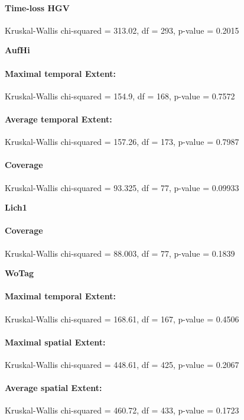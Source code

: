 \paragraph{Time-loss HGV}
Kruskal-Wallis chi-squared = 313.02, df = 293, p-value = 0.2015

\large
\centerline{\textbf{AufHi}}
\normalsize

\paragraph{Maximal temporal Extent:}
Kruskal-Wallis chi-squared = 154.9, df = 168, p-value = 0.7572

\paragraph{Average temporal Extent:}
Kruskal-Wallis chi-squared = 157.26, df = 173, p-value = 0.7987

\paragraph{Coverage}
Kruskal-Wallis chi-squared = 93.325, df = 77, p-value = 0.09933

\large
\centerline{\textbf{Lich1}}
\normalsize

\paragraph{Coverage}
Kruskal-Wallis chi-squared = 88.003, df = 77, p-value = 0.1839

\large
\centerline{\textbf{WoTag}}
\normalsize

\paragraph{Maximal temporal Extent:}
Kruskal-Wallis chi-squared = 168.61, df = 167, p-value = 0.4506

\paragraph{Maximal spatial Extent:}
Kruskal-Wallis chi-squared = 448.61, df = 425, p-value = 0.2067

\paragraph{Average spatial Extent:}
Kruskal-Wallis chi-squared = 460.72, df = 433, p-value = 0.1723

